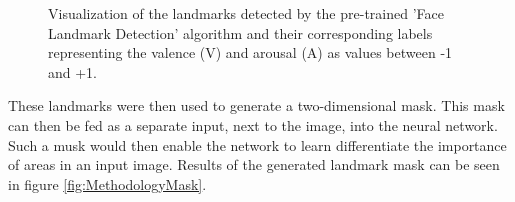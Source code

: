 \begin{figure}[ht]
  \hfill
  \caption{Visualization of the landmarks detected by the pre-trained 'Face Landmark Detection' algorithm \citep{Kazemi:2014:ShapePredictor} and their corresponding labels representing the valence (V) and arousal (A) as values between -1 and +1.}
  \label{fig:MethodologyLandmarks}
\end{figure}

These landmarks were then used to generate a two-dimensional mask. This mask can then be fed as a separate input, next to the image, into the neural network. Such a musk would then enable the network to learn differentiate the importance of areas in an input image. Results of the generated landmark mask can be seen in figure \ref{fig:MethodologyMask}.

